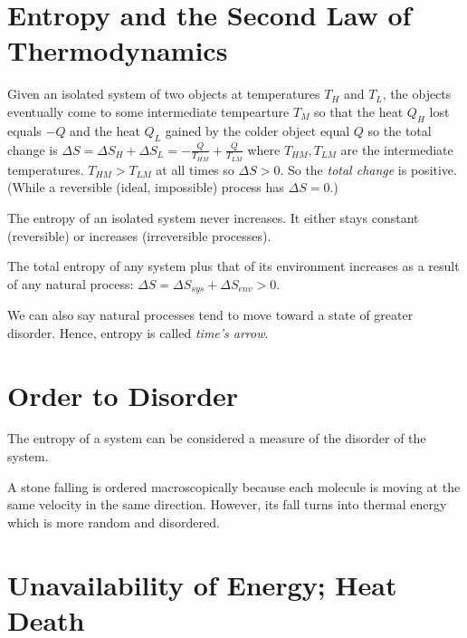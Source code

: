 \section{Entropy and the Second Law of Thermodynamics}

\begin{remark}
    Given an isolated system of two objects at temperatures $T_H$ and $T_L$, the objects eventually come to some intermediate tempearture $T_M$ so that the heat $Q_H$ lost equals $-Q$ and the heat $Q_L$ gained by the colder object equal $Q$ so the total change is $\Delta S = \Delta S_H + \Delta S_L = -\frac{Q}{T_{HM}} + \frac{Q}{T_{LM}}$ where $T_{HM}, T_{LM}$ are the intermediate temperatures. $T_{HM} > T_{LM}$ at all times so $\Delta S > 0$. So the \emph{total change} is positive. (While a reversible (ideal, impossible) process has $\Delta S = 0$.)
\end{remark}
\begin{definition}
    The entropy of an isolated system never increases. It either stays constant (reversible) or increases (irreversible processes).

    The total entropy of any system plus that of its environment increases as a result of any natural process: $\Delta S = \Delta S_{sys} + \Delta S_{env} > 0.$
    
    We can also say natural processes tend to move toward a state of greater disorder. Hence, entropy is called \emph{time's arrow}.
\end{definition}

\section{Order to Disorder}

\begin{note}
    The entropy of a system can be considered a measure of the disorder of the system. 
\end{note}
\begin{example}
    A stone falling is ordered macroscopically because each molecule is moving at the same velocity in the same direction. However, its fall turns into thermal energy which is more random and disordered.
\end{example}

\section{Unavailability of Energy; Heat Death}

